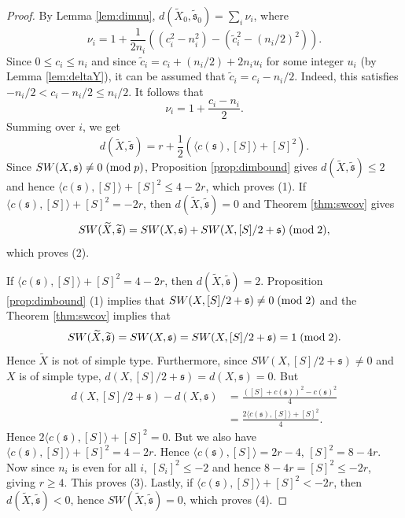 \documentclass{amsart}
\theoremstyle{definition}
\theoremstyle{remark}
\numberwithin{equation}{section}
\begin{document}
\begin{proof}
By Lemma \ref{lem:dimnu}, $d(\widetilde{X}_0 , \widetilde{\mathfrak{s}}_0) = \sum_i \nu_i$, where
\[
\nu_i = 1 + \frac{1}{2n_i}\left( (c_i^2 - n_i^2) - ( \widetilde{c}_i^2 - (n_i/2)^2 ) \right).
\]
Since $0 \le c_i \le n_i$ and since $\widetilde{c}_i = c_i + (n_i/2) + 2n_i u_i$ for some integer $u_i$ (by Lemma \ref{lem:deltaY}), it can be assumed that $\widetilde{c}_i = c_i - n_i/2$. Indeed, this satisfies $-n_i/2 < c_i - n_i/2 \le n_i/2$. It follows that
\[
\nu_i = 1 + \frac{c_i - n_i}{2}.
\]
Summing over $i$, we get
\[
d(\widetilde{X} , \widetilde{\mathfrak{s}}) = r + \frac{1}{2}\left( \langle c(\mathfrak{s}) , [S] \rangle + [S]^2 \right).
\]
Since $SW(X , \mathfrak{s}) \neq 0 \; ({\rm mod} \; p)$, Proposition \ref{prop:dimbound} gives $d(\widetilde{X} , \widetilde{\mathfrak{s}}) \le 2$ and hence $\langle c(\mathfrak{s}) , [S] \rangle + [S]^2 \le 4-2r$, which proves (1). If $\langle c(\mathfrak{s}) , [S] \rangle + [S]^2 = -2r$, then $d(\widetilde{X} , \widetilde{\mathfrak{s}}) = 0$ and Theorem \ref{thm:swcov} gives
\[
SW(\widetilde{X} , \widetilde{\mathfrak{s}} ) = SW(X , \mathfrak{s}) + SW(X , [S]/2 + \mathfrak{s}) \; ({\rm mod} \; 2),
\]
which proves (2).

If $\langle c(\mathfrak{s}) , [S] \rangle + [S]^2 = 4-2r$, then $d(\widetilde{X} , \widetilde{\mathfrak{s}}) = 2$. Proposition \ref{prop:dimbound} (1) implies that $SW(X , [S]/2 + \mathfrak{s}) \neq 0 \; ({\rm mod} \; 2)$ and the Theorem \ref{thm:swcov} implies that
\[
SW(\widetilde{X} , \widetilde{\mathfrak{s}}) = SW(X , \mathfrak{s}) = SW(X , [S]/2 + \mathfrak{s}) = 1 \; ({\rm mod} \; 2).
\]
Hence $\widetilde{X}$ is not of simple type. Furthermore, since $SW(X , [S]/2 + \mathfrak{s}) \neq 0$ and $X$ is of simple type, $d(X , [S]/2 + \mathfrak{s}) = d(X , \mathfrak{s}) = 0$. But
\begin{align*}
d(X , [S]/2 + \mathfrak{s}) - d(X , \mathfrak{s}) &= \frac{ ( [S] + c(\mathfrak{s}) )^2 - c(\mathfrak{s})^2 }{4} \\
&= \frac{ 2\langle c(\mathfrak{s}) , [S] \rangle + [S]^2 }{4}.
\end{align*}
Hence $2 \langle c(\mathfrak{s}) , [S] \rangle + [S]^2 = 0$. But we also have $\langle c(\mathfrak{s}) , [S] \rangle + [S]^2 = 4-2r$. Hence $\langle c(\mathfrak{s}) , [S] \rangle = 2r-4$, $[S]^2 = 8-4r$. Now since $n_i$ is even for all $i$, $[S_i]^2 \le -2$ and hence $8-4r = [S]^2 \le -2r$, giving $r \ge 4$. This proves (3). Lastly, if $\langle c(\mathfrak{s}) , [S] \rangle + [S]^2 < -2r$, then $d(\widetilde{X} , \widetilde{\mathfrak{s}}) < 0$, hence $SW(\widetilde{X} , \widetilde{\mathfrak{s}}) = 0$, which proves (4).
\end{proof}
\end{document}
